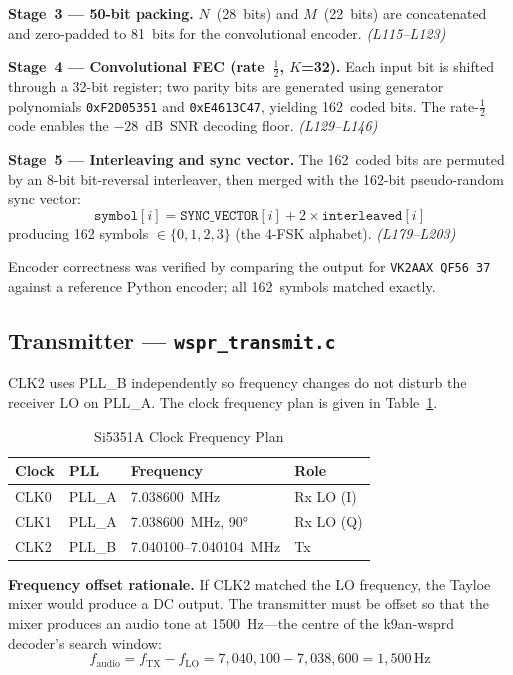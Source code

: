 \documentclass[conference]{IEEEtran}
\begin{document}
\textbf{Stage~3 --- 50-bit packing.} $N$~(28~bits) and $M$~(22~bits) are
concatenated and zero-padded to 81~bits for the convolutional encoder.
\textit{(L115--L123)}

\textbf{Stage~4 --- Convolutional FEC (rate~$\frac{1}{2}$, $K$=32).} Each input
bit is shifted through a 32-bit register; two parity bits are generated using
generator polynomials \texttt{0xF2D05351} and \texttt{0xE4613C47}, yielding
162~coded bits. The rate-$\frac{1}{2}$ code enables the $-28$~dB~SNR decoding
floor. \textit{(L129--L146)}

\textbf{Stage~5 --- Interleaving and sync vector.} The 162~coded bits are
permuted by an 8-bit bit-reversal interleaver, then merged with the 162-bit
pseudo-random sync vector:
%
\begin{equation}
  \texttt{symbol}[i]
    = \texttt{SYNC\_VECTOR}[i] + 2 \times \texttt{interleaved}[i]
  \label{eq:sync}
\end{equation}
%
producing 162 symbols $\in \{0,1,2,3\}$ (the 4-FSK alphabet).
\textit{(L179--L203)}

Encoder correctness was verified by comparing the output for
\texttt{VK2AAX QF56 37} against a reference Python encoder; all 162~symbols
matched exactly.

\subsection{Transmitter --- \texttt{wspr\_transmit.c}}

CLK2 uses PLL\_B independently so frequency changes do not disturb the receiver
LO on PLL\_A. The clock frequency plan is given in Table~\ref{tab:clocks}.

\begin{table}[t]
  \centering
  \caption{Si5351A Clock Frequency Plan}
  \label{tab:clocks}
  \begin{tabular}{llll}
    \toprule
    Clock & PLL & Frequency & Role \\
    \midrule
    CLK0 & PLL\_A & 7.038600~MHz       & Rx LO (I) \\
    CLK1 & PLL\_A & 7.038600~MHz, 90°  & Rx LO (Q) \\
    CLK2 & PLL\_B & 7.040100--7.040104~MHz & Tx \\
    \bottomrule
  \end{tabular}
\end{table}

\textbf{Frequency offset rationale.} If CLK2 matched the LO frequency, the Tayloe
mixer would produce a DC output. The transmitter must be offset so that the mixer
produces an audio tone at 1500~Hz---the centre of the k9an-wsprd decoder's search
window:
%
\begin{equation}
  f_\text{audio} = f_\text{TX} - f_\text{LO}
                 = 7{,}040{,}100 - 7{,}038{,}600 = 1{,}500\,\text{Hz}
  \label{eq:offset}
\end{equation}
\end{document}
